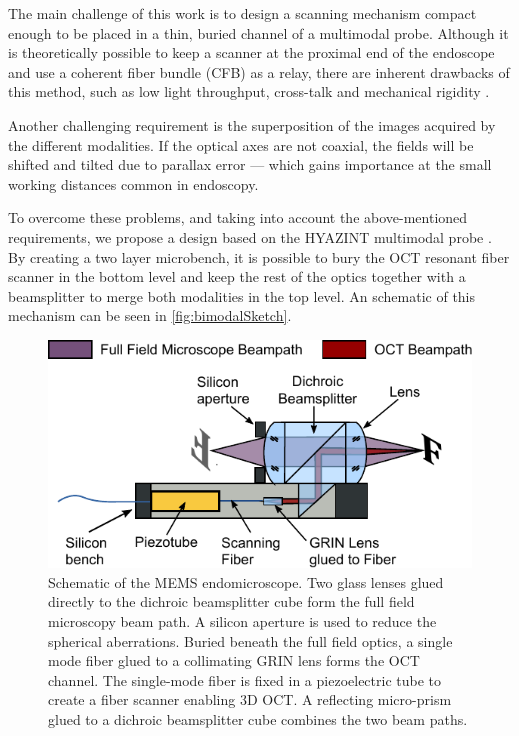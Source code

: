 The main challenge of this work is to design a scanning mechanism compact enough to be placed in a thin, buried channel of a multimodal probe.  Although it is theoretically possible to keep a scanner at the proximal end of the endoscope and use a coherent fiber bundle (CFB) as a relay, there are inherent drawbacks of this method, such as low light throughput, cross-talk and mechanical rigidity \cite{Ford2009}. 

Another challenging requirement is the superposition of the images acquired by the different modalities. If the optical axes are not coaxial, the fields will be shifted and tilted due to parallax error --- which gains importance at the small working distances common in endoscopy.

To overcome these problems, and taking into account the above-mentioned requirements, we propose a design based on the HYAZINT multimodal probe \cite{Kretschmer}. By creating a two layer microbench, it is possible to bury the OCT resonant fiber scanner in the bottom level and keep the rest of the optics together with a beamsplitter to merge both modalities in the top level. An schematic of this mechanism can be seen in \autoref{fig:bimodalSketch}.

\begin{figure}[h!]\centering
      \includegraphics{figures/30_DesignSimulation/Overview/Schematic_paper.pdf}
      \caption{Schematic of the MEMS endomicroscope. Two glass lenses glued directly to the dichroic beamsplitter cube form the full field microscopy beam path. A silicon aperture is used to reduce the spherical aberrations. Buried beneath the full field optics, a single mode fiber glued to a collimating GRIN lens forms the OCT channel. The single-mode fiber is fixed in a piezoelectric tube to create a fiber scanner enabling 3D OCT. A reflecting micro-prism glued to a dichroic beamsplitter cube combines the two beam paths.}
      \label{fig:bimodalSketch}
\end{figure}

